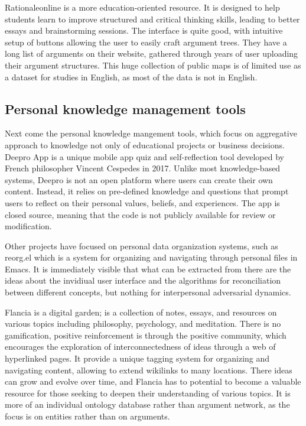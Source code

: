 \documentclass{report}
\begin{document}
Rationaleonline \cite{noauthor_rationale_nodate} is a more education-oriented resource. It is designed to help students learn to improve structured and critical thinking skills, leading to better essays and brainstorming sessions.
The interface is quite good, with intuitive setup of buttons allowing the user to easily craft argument trees.
They have a long list of arguments on their website, gathered through years of user uploading their argument structures.
This huge collection of public maps is of limited use as a dataset for studies in English, as most of the data is not in English.

\subsection{Personal knowledge management tools}
Next come the personal knowledge mangement tools, which focus on aggregative approach to knowledge not only of educational projects or business decisions.
Deepro App \cite{noauthor_deepro_nodate} is a unique mobile app quiz and self-reflection tool developed by French philosopher Vincent Cespedes \cite{noauthor_vincent_2023} in 2017. Unlike most knowledge-based systems, Deepro is not an open platform where users can create their own content. Instead, it relies on pre-defined knowledge and questions that prompt users to reflect on their personal values, beliefs, and experiences. The app is closed source, meaning that the code is not publicly available for review or modification.

Other projects have focused on personal data organization systems, such as reorg.el \cite{noauthor_reorg_2023} which is a system for organizing and navigating through personal files in Emacs. It is immediately visible that what can be extracted from there are the ideas about the invidiual user interface and the algorithms for reconciliation between different concepts, but nothing for interpersonal adversarial dynamics.

Flancia \cite{flancian_welcome_2019} is a digital garden; is a collection of notes, essays, and resources on various topics including philosophy, psychology, and meditation. There is no gamification, positive reinforcement is through the positive community, which encourages the exploration of interconnectedness of ideas through a web of hyperlinked pages. It provide a unique tagging system for organizing and navigating content, allowing to extend wikilinks to many locations. There ideas can grow and evolve over time, and Flancia has to potential to become a valuable resource for those seeking to deepen their understanding of various topics. It is more of an individual ontology database rather than argument network, as the focus is on entities rather than on arguments.
\end{document}
